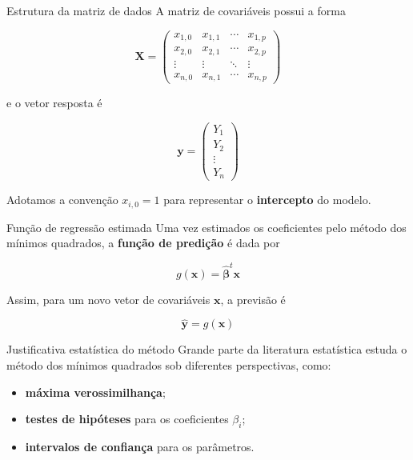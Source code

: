 \documentclass[
  ignorenonframetext,
  aspectratio=169,
]{beamer}
\providecommand{\tightlist}{%
  \setlength{\itemsep}{0pt}\setlength{\parskip}{0pt}}
\begin{document}
\begin{frame}
\begin{block}{Estrutura da matriz de dados}
\label{estrutura-da-matriz-de-dados}
A matriz de covariáveis possui a forma

\[
\boldsymbol{X} =
\begin{pmatrix}
x_{1,0} & x_{1,1} & \cdots & x_{1,p} \\
x_{2,0} & x_{2,1} & \cdots & x_{2,p} \\
\vdots  & \vdots  & \ddots & \vdots \\
x_{n,0} & x_{n,1} & \cdots & x_{n,p}
\end{pmatrix}
\]
\end{block}
\end{frame}

\begin{frame}
e o vetor resposta é

\[
\boldsymbol{y} =
\begin{pmatrix}
Y_1 \\
Y_2 \\
\vdots \\
Y_n
\end{pmatrix}
\]

Adotamos a convenção \(x_{i,0} = 1\) para representar o
\textbf{intercepto} do modelo.

\begin{block}{Função de regressão estimada}
\label{funuxe7uxe3o-de-regressuxe3o-estimada}
Uma vez estimados os coeficientes pelo método dos mínimos quadrados, a
\textbf{função de predição} é dada por

\[
g(\mathbf{x}) = \hat{\boldsymbol{\beta}}^t \mathbf{x}
\]

Assim, para um novo vetor de covariáveis \(\mathbf{x}\), a previsão é

\[
\hat{\boldsymbol{y}} = g(\mathbf{x})
\]
\end{block}

\begin{block}{Justificativa estatística do método}
\label{justificativa-estatuxedstica-do-muxe9todo}
Grande parte da literatura estatística estuda o método dos mínimos
quadrados sob diferentes perspectivas, como:

\begin{itemize}
\tightlist
\item
  \textbf{máxima verossimilhança};
\item
  \textbf{testes de hipóteses} para os coeficientes \(\beta_i\);
\item
  \textbf{intervalos de confiança} para os parâmetros.
\end{itemize}


\end{block}
\end{frame}
\end{document}

